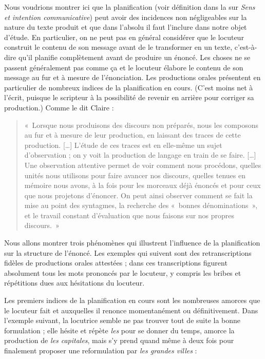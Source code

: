 Nous voudrions montrer ici que la planification (voir définition dans la  sur \textit{Sens et intention communicative}) peut avoir des incidences non négligeables sur la nature du texte produit et que dans l’absolu il faut l’inclure dans notre objet d’étude. En particulier, on ne peut pas en général considérer que le locuteur construit le contenu de son message avant de le transformer en un texte, c’est-à-dire qu’il planifie complètement avant de produire un énoncé. Les choses ne se passent généralement pas comme ça et le locuteur élabore le contenu de son message au fur et à mesure de l’énonciation. Les productions orales présentent en particulier de nombreux indices de la planification en cours. (C’est moins net à l’écrit, puisque le scripteur à la possibilité de revenir en arrière pour corriger sa production.) Comme le dit Claire \citet[17]{blanche-benveniste1990francais}:
\begin{quote}
«~Lorsque nous produisons des discours non préparés, nous les composons au fur et à mesure de leur production, en laissant des traces de cette production. […] L’étude de ces traces est en elle-même un sujet d’observation ; on y voit la production de langage en train de se faire. […] Une observation attentive permet de voir comment nous procédons, quelles unités nous utilisons pour faire avancer nos discours, quelles tenues en mémoire nous avons, à la fois pour les morceaux déjà énoncés et pour ceux que nous projetons d’énoncer. On peut ainsi observer comment se fait la mise au point des syntagmes, la recherche des «~bonnes dénominations~», et le travail constant d’évaluation que nous faisons sur nos propres discours.~»\end{quote}

Nous allons montrer trois phénomènes qui illustrent l’influence de la planification sur la structure de l’énoncé. Les exemples qui suivent sont des retranscriptions fidèles de productions orales attestées ; dans ces transcriptions figurent absolument tous les mots prononcés par le locuteur, y compris les bribes et répétitions dues aux hésitations du locuteur.

Les premiers indices de la planification en cours sont les nombreuses amorces que le locuteur fait et auxquelles il renonce momentanément ou définitivement. Dans l’exemple suivant, la locutrice semble ne pas trouver tout de suite la bonne formulation ; elle hésite et répète \textit{les} pour se donner du temps, amorce la production de \textit{les capitales}, mais s’y prend quand même à deux fois pour finalement proposer une reformulation par \textit{les grandes villes} :%


